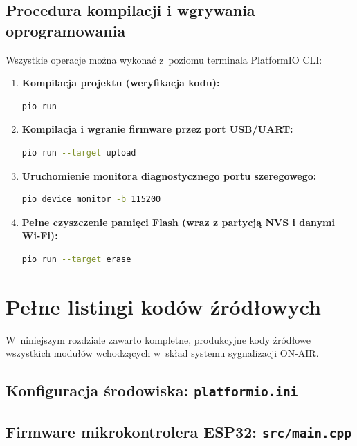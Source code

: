 \documentclass[11pt,a4paper]{article}
\begin{document}
\subsection{Procedura kompilacji i wgrywania oprogramowania}
Wszystkie operacje można wykonać z~poziomu terminala PlatformIO CLI:
\begin{enumerate}[leftmargin=1.5em]
    \item \textbf{Kompilacja projektu (weryfikacja kodu):}
    \begin{lstlisting}[language=bash]
pio run
    \end{lstlisting}
    \item \textbf{Kompilacja i wgranie firmware przez port USB/UART:}
    \begin{lstlisting}[language=bash]
pio run --target upload
    \end{lstlisting}
    \item \textbf{Uruchomienie monitora diagnostycznego portu szeregowego:}
    \begin{lstlisting}[language=bash]
pio device monitor -b 115200
    \end{lstlisting}
    \item \textbf{Pełne czyszczenie pamięci Flash (wraz z partycją NVS i danymi Wi-Fi):}
    \begin{lstlisting}[language=bash]
pio run --target erase
    \end{lstlisting}
\end{enumerate}

\newpage

\section{Pełne listingi kodów źródłowych}

W~niniejszym rozdziale zawarto kompletne, produkcyjne kody źródłowe wszystkich modułów wchodzących w~skład systemu sygnalizacji ON-AIR.

\subsection{Konfiguracja środowiska: \texttt{platformio.ini}}


\newpage
\subsection{Firmware mikrokontrolera ESP32: \texttt{src/main.cpp}}

\end{document}
